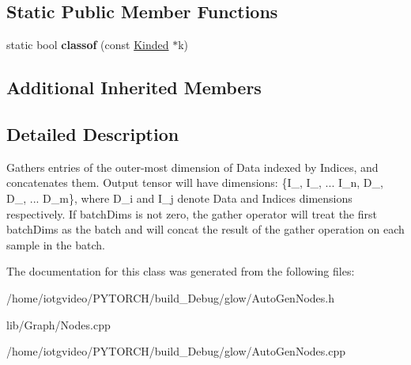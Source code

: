 \subsection*{Static Public Member Functions}
\begin{DoxyCompactItemize}
\item 
\mbox{\label{classglow_1_1_gather_node_a093ffa53e0f65d96e2f019ba9edb843e}} 
static bool {\bfseries classof} (const \hyperlink{classglow_1_1_kinded}{Kinded} $\ast$k)
\end{DoxyCompactItemize}
\subsection*{Additional Inherited Members}


\subsection{Detailed Description}
Gathers entries of the outer-\/most dimension of Data indexed by Indices, and concatenates them. Output tensor will have dimensions\+: \{I\+\_, I\+\_, ... I\+\_\+n, D\+\_, D\+\_, ... D\+\_\+m\}, where D\+\_\+i and I\+\_\+j denote Data and Indices dimensions respectively. If batch\+Dims is not zero, the gather operator will treat the first batch\+Dims as the batch and will concat the result of the gather operation on each sample in the batch. 

The documentation for this class was generated from the following files\+:\begin{DoxyCompactItemize}
\item 
/home/iotgvideo/\+P\+Y\+T\+O\+R\+C\+H/build\+\_\+\+Debug/glow/Auto\+Gen\+Nodes.\+h\item 
lib/\+Graph/Nodes.\+cpp\item 
/home/iotgvideo/\+P\+Y\+T\+O\+R\+C\+H/build\+\_\+\+Debug/glow/Auto\+Gen\+Nodes.\+cpp\end{DoxyCompactItemize}
